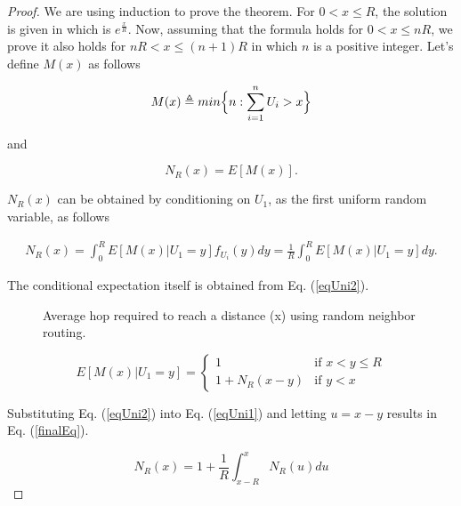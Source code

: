 \documentclass[12pt, draftclsnofoot, onecolumn]{IEEEtran}
\begin{document}
\begin{proof}
We are using induction to prove the theorem. For $0{<}x{\leq}R$, 
the solution is given in \cite{ross} which is $e^{\frac{x}{R}}$. 
Now, assuming that the formula holds for $0{<}x{\leq}nR$, we 
prove it also holds for $nR{<}x{\leq}(n+1)R$ in which $n$ is a 
positive integer. Let's define $M(x)$ as follows \cite{ross}

\begin{equation}
	M(x) \triangleq min  \Bigl\{ n:\sum_{i=1}^{n}U_i>x  \Bigr\}
\end{equation}

and 

\begin{equation}
	N_R(x)=E[M(x)].
\end{equation}

$N_R(x)$ can be obtained by conditioning on $U_{1}$, as the first 
uniform random variable, as follows

\begin{multline}
	N_R(x)= \int_{0}^{R} E[M(x)|U_1=y] f_{U_i} (y) dy =  \frac{1}{R} \int_{0}^{R} E[M(x)|U_1=y] dy.
\label{eqUni1}
\end{multline}

The conditional expectation itself is obtained from Eq. (\ref{eqUni2}).

\begin{figure*}[t!]
\begin{center}
\caption{Average hop required to reach a distance (x) using random neighbor routing.}
\label{figRandomtDistFormula}
\end{center}
\end{figure*}

\begin{equation}
	 E[M(x)|U_1=y] = 
	\left\{
		\begin{array}{ll}
			1  & \mbox{if } x < y \leq R \\
			1 + N_R(x-y) & \mbox{if } y < x
		\end{array}
	\right.
\label{eqUni2}
\end{equation}

Substituting Eq. (\ref{eqUni2}) into Eq. (\ref{eqUni1}) and letting  $u=x-y$ results in Eq. (\ref{finalEq}).

\begin{equation}
\label{finalEq}
	N_R(x)= 1+ \frac{1}{R} \int_{x-R}^{x} N_R(u) du 
\end{equation}


\end{proof}
\end{document}
